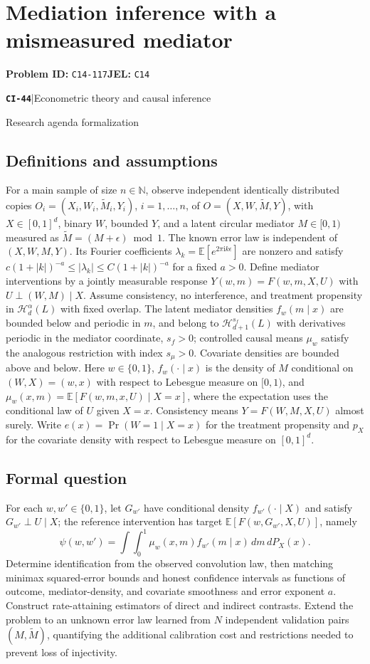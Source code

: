 \documentclass[11pt,a4paper]{article}
\newcommand{\E}{\mathbb E}
\newcommand{\N}{\mathbb N}
\newcommand{\entrymeta}[3]{{\sffamily\small\color{muted}\textbf{\texttt{#1}}\quad|\quad #2\par #3\par}}
\begin{document}
\section*{Mediation inference with a mismeasured mediator}
\textbf{Problem ID:} \texttt{C14-117}\quad \textbf{JEL:} \texttt{C14}\par
\label{problem:OP-0523}
\label{beyond:CI-44}
\entrymeta{CI-44}{Econometric theory and causal inference}{Research agenda formalization}
\subsection*{Definitions and assumptions}
For a main sample of size $n\in\N$, observe independent identically distributed copies $O_i=(X_i,W_i,\widetilde M_i,Y_i)$, $i=1,\ldots,n$, of $O=(X,W,\widetilde M,Y)$, with $X\in[0,1]^d$, binary $W$, bounded $Y$, and a latent circular mediator $M\in[0,1)$ measured as $\widetilde M=(M+\epsilon)\bmod1$. The known error law is independent of $(X,W,M,Y)$. Its Fourier coefficients $\lambda_k=\E[e^{2\pi\mathrm i k\epsilon}]$ are nonzero and satisfy $c(1+|k|)^{-a}\leq|\lambda_k|\leq C(1+|k|)^{-a}$ for a fixed $a>0$. Define mediator interventions by a jointly measurable response $Y(w,m)=F(w,m,X,U)$ with $U\perp(W,M)\mid X$. Assume consistency, no interference, and treatment propensity in $\mathcal H_d^\alpha(L)$ with fixed overlap. The latent mediator densities $f_w(m\mid x)$ are bounded below and periodic in $m$, and belong to $\mathcal H_{d+1}^{s_f}(L)$ with derivatives periodic in the mediator coordinate, $s_f>0$; controlled causal means $\mu_w$ satisfy the analogous restriction with index $s_\mu>0$. Covariate densities are bounded above and below.
Here $w\in\{0,1\}$, $f_w(\cdot\mid x)$ is the density of $M$ conditional on $(W,X)=(w,x)$ with respect to Lebesgue measure on $[0,1)$, and $\mu_w(x,m)=\E[F(w,m,x,U)\mid X=x]$, where the expectation uses the conditional law of $U$ given $X=x$. Consistency means $Y=F(W,M,X,U)$ almost surely. Write $e(x)=\Pr(W=1\mid X=x)$ for the treatment propensity and $p_X$ for the covariate density with respect to Lebesgue measure on $[0,1]^d$.
\subsection*{Formal question}
For each $w,w'\in\{0,1\}$, let $G_{w'}$ have conditional density $f_{w'}(\cdot\mid X)$ and satisfy $G_{w'}\perp U\mid X$; the reference intervention has target $\E[F(w,G_{w'},X,U)]$, namely
\[
 \psi(w,w')=\int\!\int_0^1
 \mu_w(x,m)f_{w'}(m\mid x)\,dm\,dP_X(x).
\]
Determine identification from the observed convolution law, then matching minimax squared-error bounds and honest confidence intervals as functions of outcome, mediator-density, and covariate smoothness and error exponent $a$. Construct rate-attaining estimators of direct and indirect contrasts. Extend the problem to an unknown error law learned from $N$ independent validation pairs $(M,\widetilde M)$, quantifying the additional calibration cost and restrictions needed to prevent loss of injectivity.
\end{document}
